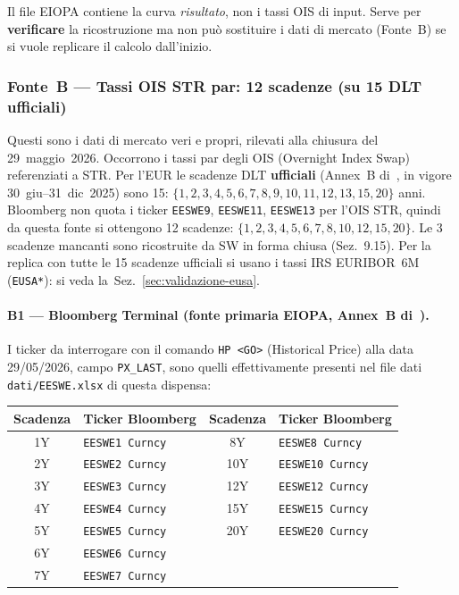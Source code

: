 \documentclass[11pt,a4paper]{article}
\theoremstyle{plain}
\theoremstyle{definition}
\theoremstyle{remark}
\begin{document}
\begin{warningbox}
Il file EIOPA contiene la curva \emph{risultato}, non i tassi OIS di input.
Serve per \textbf{verificare} la ricostruzione ma non pu\`o sostituire i dati
di mercato (Fonte~B) se si vuole replicare il calcolo dall'inizio.
\end{warningbox}

\subsubsection*{Fonte~B --- Tassi OIS \texteuro{}STR par: 12 scadenze (su 15 DLT ufficiali)}

Questi sono i dati di mercato veri e propri, rilevati alla chiusura del
29~maggio~2026. Occorrono i tassi par degli OIS (Overnight Index Swap)
referenziati a \texteuro{}STR. Per l'EUR le scadenze DLT \textbf{ufficiali}
(Annex~B di~\cite{eiopa2025}, in vigore 30~giu--31~dic~2025) sono 15:
$\{1,2,3,4,5,6,7,8,9,10,11,12,13,15,20\}$ anni.
Bloomberg non quota i ticker \texttt{EESWE9}, \texttt{EESWE11},
\texttt{EESWE13} per l'OIS \texteuro{}STR, quindi da questa fonte si ottengono
12 scadenze: $\{1,2,3,4,5,6,7,8,10,12,15,20\}$.
Le 3 scadenze mancanti sono ricostruite da SW in forma chiusa (Sez.~9.15).
Per la replica con tutte le 15 scadenze ufficiali si usano i tassi IRS
EURIBOR~6M (\texttt{EUSA*}): si veda la~Sez.~\ref{sec:validazione-eusa}.

\paragraph{B1 --- Bloomberg Terminal (fonte primaria EIOPA, Annex~B di~\cite{eiopa2025}).}
I ticker da interrogare con il comando \texttt{HP <GO>} (Historical Price)
alla data 29/05/2026, campo \texttt{PX\_LAST}, sono quelli effettivamente presenti
nel file dati \texttt{dati/EESWE.xlsx} di questa dispensa:

\begin{center}\small
\renewcommand{\arraystretch}{1.2}
\begin{tabular}{clcl}
\toprule
\textbf{Scadenza} & \textbf{Ticker Bloomberg} & \textbf{Scadenza} & \textbf{Ticker Bloomberg} \\
\midrule
1Y  & \texttt{EESWE1 Curncy}  & 8Y  & \texttt{EESWE8 Curncy}  \\
2Y  & \texttt{EESWE2 Curncy}  & 10Y & \texttt{EESWE10 Curncy} \\
3Y  & \texttt{EESWE3 Curncy}  & 12Y & \texttt{EESWE12 Curncy} \\
4Y  & \texttt{EESWE4 Curncy}  & 15Y & \texttt{EESWE15 Curncy} \\
5Y  & \texttt{EESWE5 Curncy}  & 20Y & \texttt{EESWE20 Curncy} \\
6Y  & \texttt{EESWE6 Curncy}  &     &                          \\
7Y  & \texttt{EESWE7 Curncy}  &     &                          \\
\bottomrule
\end{tabular}
\end{center}
\end{document}
